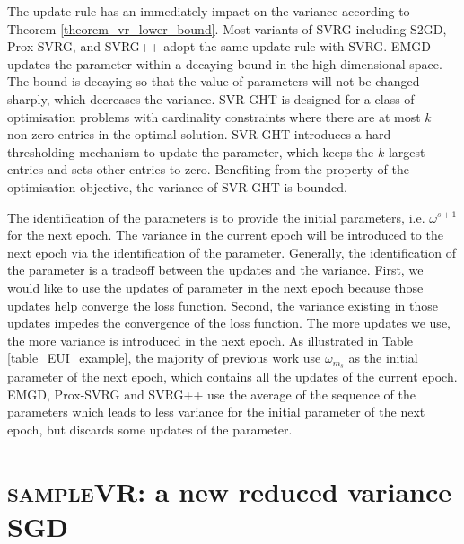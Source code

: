 \documentclass[letterpaper]{article}
\begin{document}
The update rule has an immediately impact on the variance according to Theorem \ref{theorem_vr_lower_bound}. Most variants of SVRG including S2GD, Prox-SVRG, and SVRG++ adopt the same update rule with SVRG. EMGD updates the parameter within a decaying bound in the high dimensional space. The bound is decaying so that the value of parameters will not be changed sharply, which decreases the variance.  SVR-GHT is designed for a class of optimisation problems with cardinality constraints where there are at most $k$ non-zero entries in the optimal solution. SVR-GHT  introduces a hard-thresholding mechanism to update the parameter, which keeps the $k$ largest entries and sets other entries to zero. Benefiting from  the property of the optimisation objective, the variance of SVR-GHT is bounded.

The identification of the parameters is to provide the initial parameters, i.e. $\omega^{s+1}$ for the next epoch. The variance in the current epoch will be introduced to the next epoch via the identification of the parameter. Generally, the identification of the parameter is a tradeoff between the updates and the variance. First, we would like to use the updates of parameter  in the next epoch because those updates help converge the loss function. Second, the variance existing in those updates impedes the convergence of the loss function. The more updates we use, the more variance is introduced in the next epoch. As illustrated in Table \ref{table_EUI_example},  the majority of previous work use $\omega_{m_s}$ as the initial parameter of the next epoch, which contains all the updates of the current epoch. EMGD, Prox-SVRG and SVRG++ use the average of the sequence of the parameters which leads to less variance for the initial parameter of the next epoch, but discards some updates of the parameter. 




\section{\textsc{sampleVR}: a new reduced variance SGD}
\label{sect_sample_vr}
\end{document}
